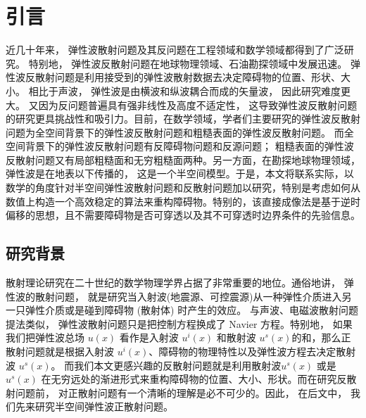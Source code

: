 \chapter{引言}\label{chap:introduction}
近几十年来， 弹性波散射问题及其反问题在工程领域和数学领域都得到了广泛研究\cite{landau}。 特别地， 弹性波反散射问题在地球物理领域、石油勘探领域中发展迅速。
弹性波反散射问题是利用接受到的弹性波散射数据去决定障碍物的位置、形状、大小。 相比于声波， 弹性波是由横波和纵波耦合而成的矢量波， 因此研究难度更大。 又因为反问题普遍具有强非线性及高度不适定性， 这导致弹性波反散射问题的研究更具挑战性和吸引力。目前，在数学领域，学者们主要研究的弹性波反散射问题为全空间背景下的弹性波反散射问题\cite{bonnet2005inverse,bao2018inverse}和粗糙表面的弹性波反散射问题\cite{liu2019near}。 而全空间背景下的弹性波反散射问题有反障碍物问题和反源问题； 粗糙表面的弹性波反散射问题又有局部粗糙面和无穷粗糙面两种。另一方面，在勘探地球物理领域， 弹性波是在地表以下传播的， 这是一个半空间模型。于是，本文将联系实际，以数学的角度针对半空间弹性波散射问题和反散射问题加以研究，特别是考虑如何从数值上构造一个高效稳定的算法来重构障碍物。特别的，该直接成像法是基于逆时偏移的思想，且不需要障碍物是否可穿透以及其不可穿透时边界条件的先验信息。
\section{研究背景}
 散射理论研究在二十世纪的数学物理学界占据了非常重要的地位。通俗地讲， 弹性波的散射问题， 就是研究当入射波(地震源、可控震源)从一种弹性介质进入另一只弹性介质或是碰到障碍物 (散射体) 时产生的效应。 与声波、电磁波散射问题提法类似， 弹性波散射问题只是把控制方程换成了 Navier 方程。特别地， 如果我们把弹性波总场 $u(x)$ 看作是入射波 $u^i(x)$ 和散射波 $u^s(x)$的和，那么正散射问题就是根据入射波 $u^i(x)$、障碍物的物理特性以及弹性波方程去决定散射波 $u^s(x)$。 而我们本文更感兴趣的反散射问题就是利用散射波$u^s(x)$ 或是 $u^s(x)$ 在无穷远处的渐进形式来重构障碍物的位置、大小、形状。而在研究反散射问题前， 对正散射问题有一个清晰的理解是必不可少的。因此， 在后文中， 我们先来研究半空间弹性波正散射问题。
